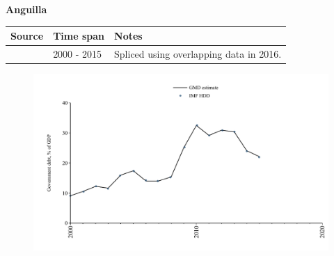 \documentclass[12pt,a4paper,landscape]{article}
\begin{document}
\begin{adjustbox}{max totalsize={\paperwidth}{\paperheight},center}
\begin{minipage}[t][\textheight][t]{\textwidth}
\vspace*{0.5cm}
{}
\begin{center}
{\Large\bfseries Anguilla}
\end{center}
\vspace{0.5cm}
\begin{table}[H]
\centering
\small
\begin{tabular}{|l|l|l|}
\hline
\textbf{Source} & \textbf{Time span} & \textbf{Notes} \\
\hline
\rowcolor{white}\cite{IMF_HDD}& 2000 - 2015 &Spliced using overlapping data in 2016.\\
\hline
\end{tabular}
\end{table}
\begin{figure}[H]
\centering
\includegraphics[width=\textwidth,height=0.6\textheight,keepaspectratio]{graphs/AIA_govdebt_GDP.pdf}
\end{figure}
\end{minipage}
\end{adjustbox}
\end{document}

